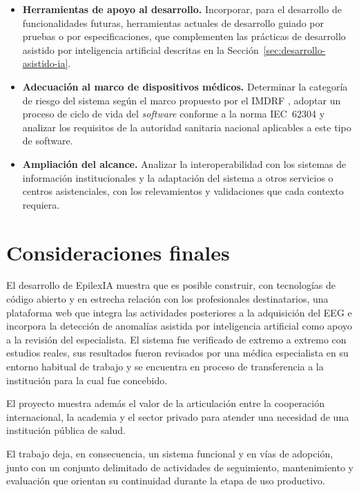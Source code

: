 \begin{itemize}
    \item \textbf{Herramientas de apoyo al desarrollo.}
    Incorporar, para el desarrollo de funcionalidades futuras, herramientas actuales de desarrollo guiado por pruebas o por especificaciones, que complementen las prácticas de desarrollo asistido por inteligencia artificial descritas en la Sección~\ref{sec:desarrollo-asistido-ia}.

    \item \textbf{Adecuación al marco de dispositivos médicos.}
    Determinar la categoría de riesgo del sistema según el marco propuesto por el IMDRF \citep{IMDRF2014SaMDRisk}, adoptar un proceso de ciclo de vida del \textit{software} conforme a la norma IEC~62304 \citep{IEC62304:2006} y analizar los requisitos de la autoridad sanitaria nacional aplicables a este tipo de software.

    \item \textbf{Ampliación del alcance.}
    Analizar la interoperabilidad con los sistemas de información institucionales y la adaptación del sistema a otros servicios o centros asistenciales, con los relevamientos y validaciones que cada contexto requiera.
\end{itemize}


\section{Consideraciones finales}
\label{sec:consideraciones-finales}

El desarrollo de EpilexIA muestra que es posible construir, con tecnologías de código abierto y en estrecha relación con los profesionales destinatarios, una plataforma web que integra las actividades posteriores a la adquisición del EEG e incorpora la detección de anomalías asistida por inteligencia artificial como apoyo a la revisión del especialista.
El sistema fue verificado de extremo a extremo con estudios reales, sus resultados fueron revisados por una médica especialista en su entorno habitual de trabajo y se encuentra en proceso de transferencia a la institución para la cual fue concebido.

El proyecto muestra además el valor de la articulación entre la cooperación internacional, la academia y el sector privado para atender una necesidad de una institución pública de salud.

El trabajo deja, en consecuencia, un sistema funcional y en vías de adopción, junto con un conjunto delimitado de actividades de seguimiento, mantenimiento y evaluación que orientan su continuidad durante la etapa de uso productivo.
